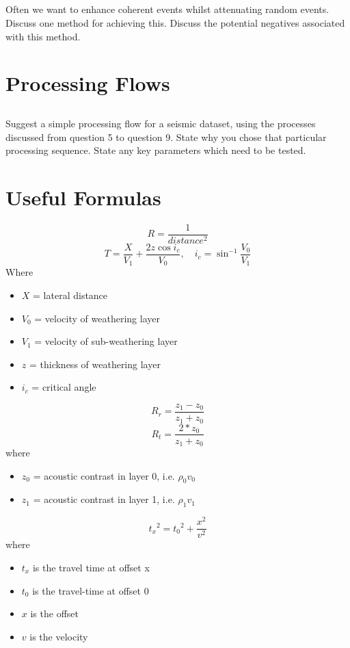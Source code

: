 \documentclass[a4paper, 10pt]{article}
\begin{document}
\subsection{}
Often we want to enhance coherent events whilst attenuating random events. Discuss one method for achieving this. Discuss the potential negatives associated with this method.
\section{Processing Flows}
\subsection{}
Suggest a simple processing flow for a seismic dataset, using the processes discussed from question 5 to question 9.  State why you chose that particular processing sequence.  State any key parameters which need to be tested.

\newpage
\section{Useful Formulas}
\[R = \frac{1}{distance^2}\]
\[T = \frac{X}{V_1} + \frac{2z \cos{i_c}}{V_0}, \quad i_c = \sin^{-1}{\frac{V_0}{V_1}} \]
Where
\begin{itemize}
\item $X$ = lateral distance
\item $V_0$ = velocity of weathering layer
\item $V_1$ = velocity of sub-weathering layer
\item $z$ = thickness of weathering layer
\item $i_c$ = critical angle
\end{itemize}

\[ R_r = \frac{z_1 - z_0}{z_1+z_0}\]
\[ R_t = \frac{2*z_0}{z_1+z_0}\]
where 
\begin{itemize}
\item $z_0$  = acoustic contrast in layer 0, i.e. $\rho_0 v_0$
\item $z_1$ = acoustic contrast in layer 1, i.e. $\rho_1 v_1$
\end{itemize}

\[ {t_x}^2 = {t_0}^2 + \frac{x^2}{v^2}\]
where
\begin{itemize}
\item $t_x$ is the travel time at offset x
\item $t_0$ is the travel-time at offset 0
\item $x$ is the offset
\item $v$ is the velocity
\end{itemize}
\end{document}
